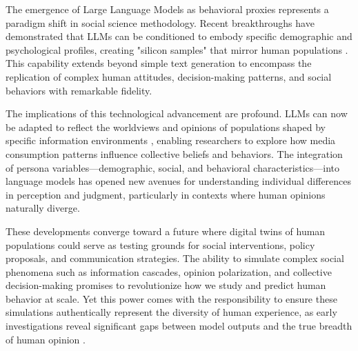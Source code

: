 \begin{enumerate}
    The emergence of Large Language Models as behavioral proxies represents a paradigm shift in social science methodology. Recent breakthroughs have demonstrated that LLMs can be conditioned to embody specific demographic and psychological profiles, creating "silicon samples" that mirror human populations \cite{argyle2023out,park2024generative}. This capability extends beyond simple text generation to encompass the replication of complex human attitudes, decision-making patterns, and social behaviors with remarkable fidelity.

    The implications of this technological advancement are profound. LLMs can now be adapted to reflect the worldviews and opinions of populations shaped by specific information environments \cite{chu2023language}, enabling researchers to explore how media consumption patterns influence collective beliefs and behaviors. The integration of persona variables—demographic, social, and behavioral characteristics—into language models \cite{hu2024quantifying} has opened new avenues for understanding individual differences in perception and judgment, particularly in contexts where human opinions naturally diverge.

    These developments converge toward a future where digital twins of human populations could serve as testing grounds for social interventions, policy proposals, and communication strategies. The ability to simulate complex social phenomena such as information cascades, opinion polarization, and collective decision-making \cite{wang2025user} promises to revolutionize how we study and predict human behavior at scale. Yet this power comes with the responsibility to ensure these simulations authentically represent the diversity of human experience, as early investigations reveal significant gaps between model outputs and the true breadth of human opinion \cite{santurkar2023whose,rescala2024can}.


\end{enumerate}
